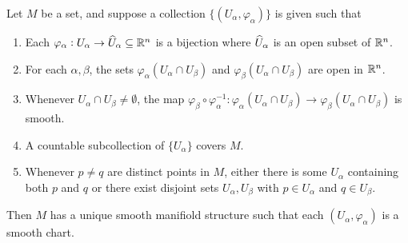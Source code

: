 \begin{lemma}
    Let $M$ be a set, and suppose a collection $\{(U_\alpha,\varphi_\alpha)\}$ is given such that 
    \begin{enumerate}[label=(\alph*)]
        \item Each $\varphi_\alpha: U_\alpha\to\widehat{U}_\alpha\subseteq\mathbb{R}^n$ is a bijection where $\widehat{U}_\alpha$ is an open subset of $\mathbb{R}^n$. 
        \item For each $\alpha,\beta$, the sets $\varphi_\alpha(U_\alpha\cap U_\beta)$ and $\varphi_\beta(U_\alpha\cap U_\beta)$ are open in $\mathbb{R}^n$.
        \item Whenever $U_\alpha\cap U_\beta\ne\emptyset$, the map $\varphi_\beta\circ\varphi_\alpha^{-1}:\varphi_\alpha(U_\alpha\cap U_\beta)\to\varphi_\beta(U_\alpha\cap U_\beta)$ is smooth.
        \item A countable subcollection of $\{U_\alpha\}$ covers $M$.
        \item Whenever $p\ne q$ are distinct points in $M$, either there is some $U_\alpha$ containing both $p$ and $q$ or there exist disjoint sets $U_\alpha, U_\beta$ with $p\in U_\alpha$ and $q\in U_\beta$.
    \end{enumerate}
    Then $M$ has a unique smooth manifiold structure such that each $(U_\alpha,\varphi_\alpha)$ is a smooth chart.
\end{lemma}
